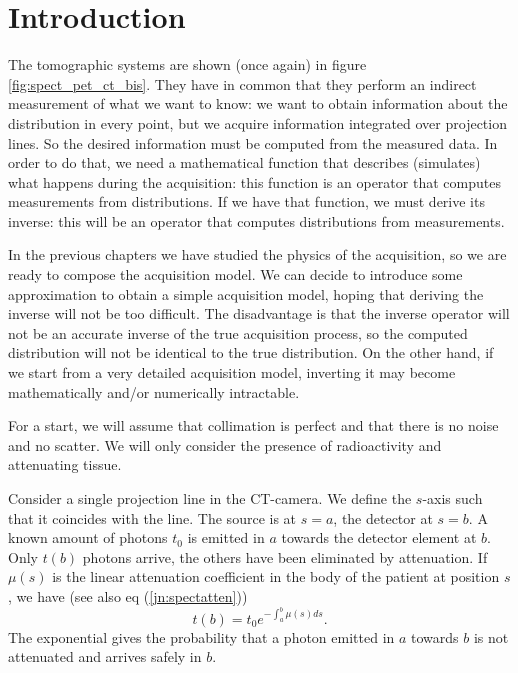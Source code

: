 \documentclass[11pt,oneside]{book}
\begin{document}
\section{Introduction}
The tomographic systems are shown (once again) in figure
\ref{fig:spect_pet_ct_bis}. They have in common that they perform an indirect
measurement of what we want to know: we want to obtain information about the
distribution in every point, but we acquire information integrated over
projection lines. So the desired information must be computed from the
measured data. In order to do that, we need a mathematical function that
describes (simulates) what happens during the acquisition: this function is an
operator that computes measurements from distributions. If we have that
function, we must derive its inverse: this will be an operator that computes
distributions from measurements.

In the previous chapters we have studied the physics of the acquisition, so we
are ready to compose the acquisition model. We can decide to introduce some
approximation to obtain a simple acquisition model, hoping that deriving the
inverse will not be too difficult. The disadvantage is that the inverse
operator will not be an accurate inverse of the true acquisition process, so
the computed distribution will not be identical to the true distribution. On
the other hand, if we start from a very detailed acquisition model, inverting
it may become mathematically and/or numerically intractable.

For a start, we will assume that collimation is perfect and that there is no
noise and no scatter. We will only consider the presence of radioactivity
and attenuating tissue.

Consider a single projection line in the CT-camera. We define the $s$-axis
such that it coincides with the line. The source is at $s=a$, the detector at
$s = b$. A known amount of photons $t_0$ is emitted in $a$ towards the
detector element at $b$. Only $t(b)$ photons arrive, the others have been
eliminated by attenuation. If $\mu(s)$ is the linear attenuation coefficient
in the body of the patient at position $s$, we have (see also eq
(\ref{jn:spectatten}))
\begin{equation}
  t(b) = t_0 e^{- \int_a^b \mu(s) ds}. \label{eq:ct_proj}
\end{equation}
The exponential gives the probability that a photon emitted in $a$ towards $b$
is not attenuated and arrives safely in $b$.
\end{document}
